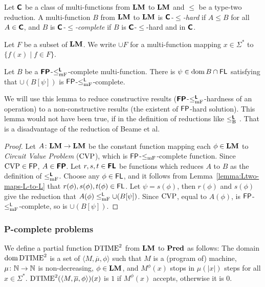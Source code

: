\documentclass[envcountsame,orivec,oribibl]{llncs}
\begin{document}
Let $\text{\bfseries \sffamily \upshape C}$ be a class of multi-functions from $\mathbf{LM}$ to $\mathbf{LM}$
and $\leq$ be a type-two reduction.
A multi-function $B$ from $\mathbf{LM}$ to $\mathbf{LM}$ is \emph{$\text{\bfseries \sffamily \upshape C}$-$\leq$-hard} if $A \leq B$ for all $A \in \text{\bfseries \sffamily \upshape C}$,
and $B$ is \emph{$\text{\bfseries \sffamily \upshape C}$-$\leq$-complete} 
if $B$ is $\text{\bfseries \sffamily \upshape C}$-$\leq$-hard and in $\text{\bfseries \sffamily \upshape C}$.


Let $F$ be a subset of $\mathbf{LM}$.
We write $\cup F$ for a multi-function mapping $x \in \Sigma^*$ to 
$\{f(x) \mid f \in F\}$.

\begin{lemma}
\label{lemma:P-complete}
Let $B$ be a $\text{\bfseries \sffamily \upshape FP}$-$\leq _{\mathrm{mF}} ^{\text{\bfseries \sffamily \upshape L}}$-complete multi-function.
There is $\psi \in \mathop{\rm dom} B \cap \mathsf{FL}$ satisfying that
 $\cup (B[\psi])$ is $\mathsf{FP}$-$\le^{\mathsf{L}}_{\mathrm{mF}}$-complete.
\end{lemma}

We will use this lemma to reduce constructive results
($\text{\bfseries \sffamily \upshape FP}$-$\leq _{\mathrm{mF}} ^{\text{\bfseries \sffamily \upshape L}}$-hardness of an operation) to a non-constructive 
results (the existent of $\mathsf{FP}$-hard solution).
This lemma would not have been true, if in the definition 
of reductions like $\leq _{\mathrm B} ^{\text{\bfseries \sffamily \upshape L}}$ \cite[Lemma~3.6]{kawamura2012complexity}.
That is a disadvantage of the reduction of Beame et al.

\begin{proof}
Let $A \colon \mathbf{LM} \to \mathbf{LM}$ be the constant function mapping each $\phi \in \mathbf{LM}$ to \emph{Circuit Value Problem} ($\mathrm{CVP}$), which is $\mathsf{FP}$-$\leq _{\mathrm{mF}}$-complete function.
Since $\mathrm{CVP} \in \mathsf{FP}$, $A \in \text{\bfseries \sffamily \upshape FP}$.
Let $r, s, t \in \text{\bfseries \sffamily \upshape FL}$ be functions which reduces $A$ to $B$
as the definition of $\leq _{\mathrm{mF}} ^{\text{\bfseries \sffamily \upshape L}}$.
Choose any $\phi \in \mathsf{FL}$, and it follows from Lemma~\ref{lemma:Ltwo-maps-L-to-L}
that $r(\phi), s(\phi), t(\phi) \in \mathsf{FL}$.
Let $\psi = s(\phi)$, then $r(\phi)$ and $s(\phi)$ give the reduction that
$A(\phi) \leq _{\mathrm{mF}}^{\mathsf{L}} \cup (B[\psi])$.
Since $\mathrm{CVP}$, equal to $A(\phi)$, is $\mathsf{FP}$-$\leq _{\mathrm{mF}}^{\mathsf{L}}$-complete,
so is $\cup (B[\psi])$.
\end{proof}


\subsubsection{P-complete problems}

We define a partial function $\mathrm{DTIME}^2$ from $\mathbf{LM}$ to $\mathbf{Pred}$ as follows:
The domain $\mathop{\rm dom} \mathrm{DTIME}^2$ is a set of $\langle M, \overline \mu, \phi \rangle$
such that $M$ is a (program of) machine, $\mu \colon \mathbb N \to \mathbb N$ is non-decreasing, $\phi \in \mathbf{LM}$, and $M^\phi(x)$ stops in $\mu(|x|)$ steps for all $x \in \Sigma^*$.
$\mathrm{DTIME}^2(\langle M, \overline \mu, \phi \rangle)(x)$ is $1$ if
$M^\phi(x)$ accepts, otherwise it is 0.
\end{document}
